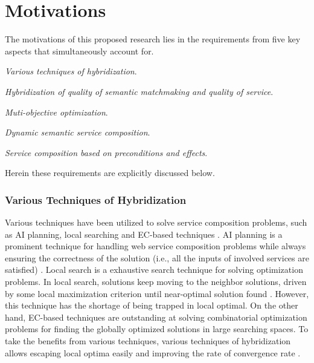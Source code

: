 \section{Motivations}\label{C:motivation}
The motivations of this proposed research lies in the requirements from five key aspects that simultaneously account for. 
\begin{enumerate*}
 \item \emph{Various techniques of hybridization}.
 \item \emph{Hybridization of quality of semantic matchmaking and quality of service}.
 \item \emph{Muti-objective optimization}.
 \item \emph{Dynamic semantic service composition}.
 \item \emph{Service composition based on preconditions and effects}.
\end{enumerate*}
Herein these requirements are explicitly discussed below. 
\subsubsection{Various Techniques of Hybridization}

Various techniques have been utilized to solve service composition problems, such as AI planning, local searching and EC-based techniques \cite{feng2013dynamic,parejo2008qos,qi2010combining,wang2014automated}. AI planning is a prominent technique for handling web service composition problems while always ensuring the correctness of the solution (i.e., all the inputs of involved services are satisfied) \cite{wang2014automated}.  Local search is a exhaustive search technique for solving optimization problems. In local search, solutions keep moving to the neighbor solutions, driven by some local maximization criterion until near-optimal solution found \cite{parejo2008qos}. However, this technique has the shortage of being trapped in local optimal. On the other hand, EC-based techniques are outstanding at solving combinatorial optimization problems for finding the globally optimized solutions in large searching spaces. To take the benefits from various techniques,  various techniques of hybridization allows escaping local optima easily and improving the rate of convergence rate \cite{renders1996hybrid}.


